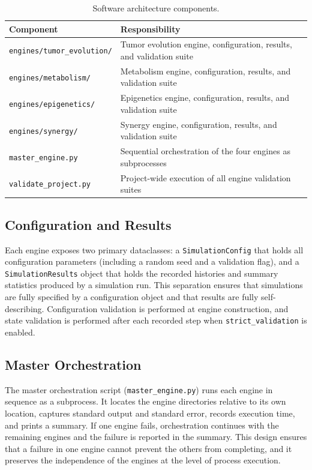 \documentclass[12pt,a4paper]{article}
\begin{document}
\begin{table}[H]
\centering
\caption{Software architecture components.}
\label{tab:architecture}
\begin{tabular}{p{3.4cm} p{9.6cm}}
\toprule
\textbf{Component} & \textbf{Responsibility} \\
\midrule
\texttt{engines/tumor\_evolution/} & Tumor evolution engine, configuration, results, and validation suite \\
\texttt{engines/metabolism/} & Metabolism engine, configuration, results, and validation suite \\
\texttt{engines/epigenetics/} & Epigenetics engine, configuration, results, and validation suite \\
\texttt{engines/synergy/} & Synergy engine, configuration, results, and validation suite \\
\texttt{master\_engine.py} & Sequential orchestration of the four engines as subprocesses \\
\texttt{validate\_project.py} & Project-wide execution of all engine validation suites \\
\bottomrule
\end{tabular}
\end{table}

\subsection{Configuration and Results}

Each engine exposes two primary dataclasses: a \texttt{SimulationConfig} that holds all configuration parameters (including a random seed and a validation flag), and a \texttt{SimulationResults} object that holds the recorded histories and summary statistics produced by a simulation run. This separation ensures that simulations are fully specified by a configuration object and that results are fully self-describing. Configuration validation is performed at engine construction, and state validation is performed after each recorded step when \texttt{strict\_validation} is enabled.

\subsection{Master Orchestration}

The master orchestration script (\texttt{master\_engine.py}) runs each engine in sequence as a subprocess. It locates the engine directories relative to its own location, captures standard output and standard error, records execution time, and prints a summary. If one engine fails, orchestration continues with the remaining engines and the failure is reported in the summary. This design ensures that a failure in one engine cannot prevent the others from completing, and it preserves the independence of the engines at the level of process execution.
\end{document}
